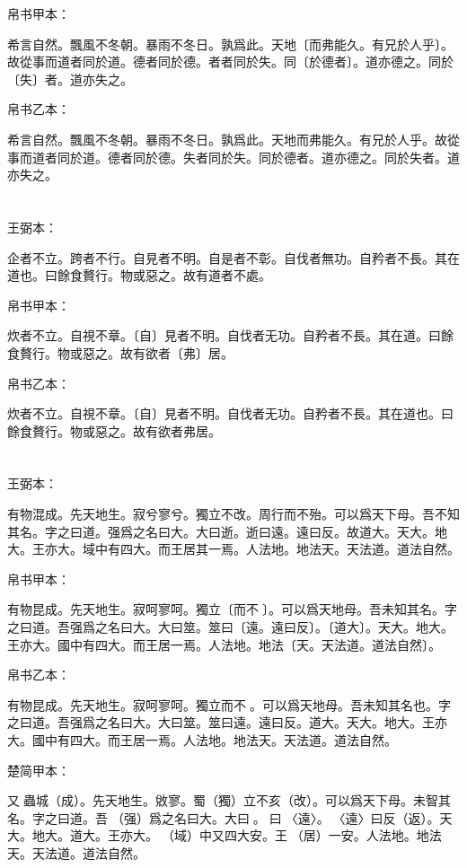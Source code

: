 \documentclass[a5paper]{ctexbook}
\begin{document}
    
    帛书甲本：

    希言自然。飄風不冬朝。暴雨不冬日。孰爲此。天地〔而弗能久。有兄於人乎〕。故從事而道者同於道。德者同於德。者者同於失。同〔於德者〕。道亦德之。同於〔失〕者。道亦失之。

    帛书乙本：

    希言自然。飄風不冬朝。暴雨不冬日。孰爲此。天地而弗能久。有兄於人乎。故從事而道者同於道。德者同於德。失者同於失。同於德者。道亦德之。同於失者。道亦失之。

    \chapter{}
    王弼本：

    企者不立。跨者不行。自見者不明。自是者不彰。自伐者無功。自矜者不長。其在道也。曰餘食贅行。物或惡之。故有道者不處。

    
    帛书甲本：

    炊者不立。自視不章。〔自〕見者不明。自伐者无功。自矜者不長。其在道。曰餘食贅行。物或惡之。故有欲者〔弗〕居。

    帛书乙本：

    炊者不立。自視不章。〔自〕見者不明。自伐者无功。自矜者不長。其在道也。曰餘食贅行。物或惡之。故有欲者弗居。

    \chapter{}
    王弼本：

    有物混成。先天地生。寂兮寥兮。獨立不改。周行而不殆。可以爲天下母。吾不知其名。字之曰道。强爲之名曰大。大曰逝。逝曰遠。遠曰反。故道大。天大。地大。王亦大。域中有四大。而王居其一焉。人法地。地法天。天法道。道法自然。

    
    帛书甲本：

    有物昆成。先天地生。寂呵寥呵。獨立〔而不󱁡〕。可以爲天地母。吾未知其名。字之曰道。吾强爲之名曰大。大曰筮。筮曰〔遠。遠曰反〕。〔道大〕。天大。地大。王亦大。國中有四大。而王居一焉。人法地。地法〔天。天法道。道法自然〕。

    帛书乙本：

    有物昆成。先天地生。寂呵寥呵。獨立而不󱁡。可以爲天地母。吾未知其名也。字之曰道。吾强爲之名曰大。大曰筮。筮曰遠。遠曰反。道大。天大。地大。王亦大。國中有四大。而王居一焉。人法地。地法天。天法道。道法自然。

    楚简甲本：

    又󶴷蟲城（成）。先天地生。敓寥。蜀（獨）立不亥（改）。可以爲天下母。未智其名。字之曰道。吾󶴔（强）爲之名曰大。大曰󶴹。󶴹曰󶴿〈遠〉。󶴿〈遠〉曰反（返）。天大。地大。道大。王亦大。󶴺（域）中又四大安。王󶵀（居）一安。人法地。地法天。天法道。道法自然。
\end{document}
